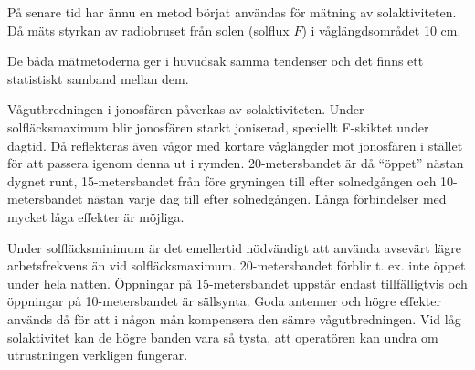 
På senare tid har ännu en metod börjat användas för mätning av
solaktiviteten. Då mäts styrkan av radiobruset från solen (solflux
\(F\)) i våglängdsområdet 10 cm.

De båda mätmetoderna ger i huvudsak samma tendenser och det finns ett
statistiskt samband mellan dem.

Vågutbredningen i jonosfären påverkas av solaktiviteten. Under
solfläcksmaximum blir jonosfären starkt joniserad, speciellt F-skiktet
under dagtid. Då reflekteras även vågor med kortare våglängder mot
jonosfären i stället för att passera igenom denna ut i
rymden. 20-metersbandet är då ``öppet'' nästan dygnet runt,
15-metersbandet från före gryningen till efter solnedgången och
10-metersbandet nästan varje dag till efter solnedgången. Långa
förbindelser med mycket låga effekter är möjliga.

Under solfläcksminimum är det emellertid nödvändigt att använda
avsevärt lägre arbetsfrekvens än vid solfläcksmaximum.
20-metersbandet förblir t. ex. inte öppet under hela natten. Öppningar
på 15-metersbandet uppstår endast tillfälligtvis och öppningar på
10-metersbandet är sällsynta.  Goda antenner och högre effekter
används då för att i någon mån kompensera den sämre
vågutbredningen. Vid låg solaktivitet kan de högre banden vara så
tysta, att operatören kan undra om utrustningen verkligen fungerar.
